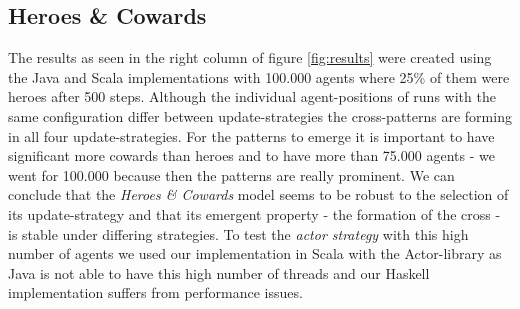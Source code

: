\subsection{Heroes \& Cowards}
The results as seen in the right column of figure \ref{fig:results} were created using the Java and Scala implementations with 100.000 agents where 25\% of them were heroes after 500 steps. Although the individual agent-positions of runs with the same configuration differ between update-strategies the cross-patterns are forming in all four update-strategies. For the patterns to emerge it is important to have significant more cowards than heroes and to have more than 75.000 agents - we went for 100.000 because then the patterns are really prominent. We can conclude that the \textit{Heroes \& Cowards} model seems to be robust to the selection of its update-strategy and that its emergent property - the formation of the cross - is stable under differing strategies. To test the \textit{actor strategy} with this high number of agents we used our implementation in Scala with the Actor-library as Java is not able to have this high number of threads and our Haskell implementation suffers from performance issues.